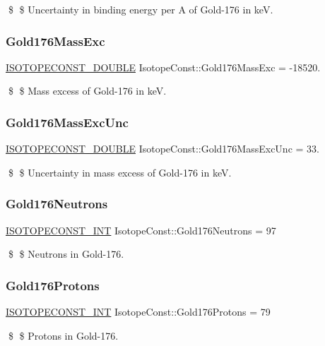 \$ \$ Uncertainty in binding energy per A of Gold-\/176 in keV. \mbox{\label{group___isotope_const-_gold-_au176_ga4518aeccaff216510f5fb986c7d01267}} 
\subsubsection{\texorpdfstring{Gold176\+Mass\+Exc}{Gold176MassExc}}
{\footnotesize\ttfamily \mbox{\hyperlink{group___isotope_const-_macros_ga8f45a7272ce02c0b4c65c44636ed719a}{I\+S\+O\+T\+O\+P\+E\+C\+O\+N\+S\+T\+\_\+\+D\+O\+U\+B\+LE}} Isotope\+Const\+::\+Gold176\+Mass\+Exc = -\/18520.}

\$ \$ Mass excess of Gold-\/176 in keV. \mbox{\label{group___isotope_const-_gold-_au176_gaa7cd985568999627dbd87fcd15fd5f9a}} 
\subsubsection{\texorpdfstring{Gold176\+Mass\+Exc\+Unc}{Gold176MassExcUnc}}
{\footnotesize\ttfamily \mbox{\hyperlink{group___isotope_const-_macros_ga8f45a7272ce02c0b4c65c44636ed719a}{I\+S\+O\+T\+O\+P\+E\+C\+O\+N\+S\+T\+\_\+\+D\+O\+U\+B\+LE}} Isotope\+Const\+::\+Gold176\+Mass\+Exc\+Unc = 33.}

\$ \$ Uncertainty in mass excess of Gold-\/176 in keV. \mbox{\label{group___isotope_const-_gold-_au176_ga349d8a65144512e55aab983b0e68378a}} 
\subsubsection{\texorpdfstring{Gold176\+Neutrons}{Gold176Neutrons}}
{\footnotesize\ttfamily \mbox{\hyperlink{group___isotope_const-_macros_ga5f18360b3e99483a35c32d789e62621c}{I\+S\+O\+T\+O\+P\+E\+C\+O\+N\+S\+T\+\_\+\+I\+NT}} Isotope\+Const\+::\+Gold176\+Neutrons = 97}

\$ \$ Neutrons in Gold-\/176. \mbox{\label{group___isotope_const-_gold-_au176_ga8d6887bff696df51e53da5f0290b3df9}} 
\subsubsection{\texorpdfstring{Gold176\+Protons}{Gold176Protons}}
{\footnotesize\ttfamily \mbox{\hyperlink{group___isotope_const-_macros_ga5f18360b3e99483a35c32d789e62621c}{I\+S\+O\+T\+O\+P\+E\+C\+O\+N\+S\+T\+\_\+\+I\+NT}} Isotope\+Const\+::\+Gold176\+Protons = 79}

\$ \$ Protons in Gold-\/176. 